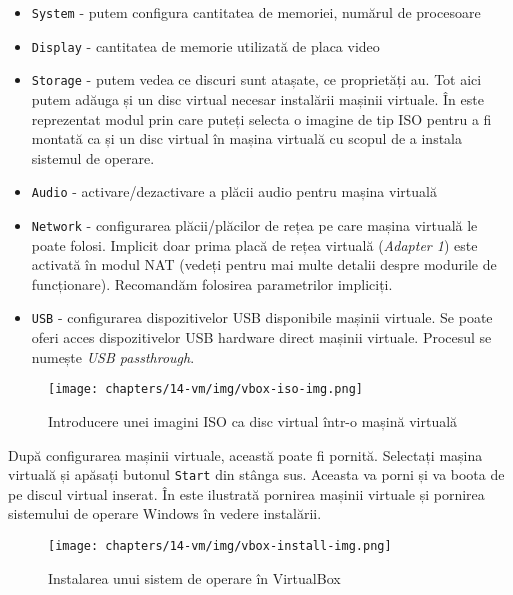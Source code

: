 \begin{itemize}
  \item \texttt{System} - putem configura cantitatea de memoriei, numărul de
		procesoare
              \item \texttt{Display} - cantitatea de memorie utilizată de placa video
              \item \texttt{Storage} - putem vedea ce discuri sunt atașate, ce proprietăți au.
		Tot aici putem adăuga și un disc virtual necesar instalării
		mașinii virtuale. În 
		este reprezentat modul prin care puteți selecta o imagine de tip
		ISO pentru a fi montată ca și un disc virtual în mașina virtuală
		cu scopul de a instala sistemul de operare.
              \item \texttt{Audio} - activare/dezactivare a plăcii audio pentru mașina virtuală
              \item \texttt{Network} - configurarea plăcii/plăcilor de rețea pe care mașina
		virtuală le poate folosi. Implicit doar prima placă de rețea virtuală
		(\textit{Adapter 1}) este activată în modul NAT (vedeți
		 pentru mai multe
		detalii despre modurile de funcționare). Recomandăm folosirea
		parametrilor impliciți.
              \item \texttt{USB} - configurarea dispozitivelor USB disponibile mașinii
		virtuale. Se poate oferi acces dispozitivelor USB hardware direct
		mașinii virtuale. Procesul se numește \textit{USB passthrough}.
\end{itemize}

\begin{figure}[!htbp]
	\centering
	\texttt{[image: chapters/14-vm/img/vbox-iso-img.png]}
	\caption{Introducere unei imagini ISO ca disc virtual într-o mașină virtuală}
	\label{fig:vm:vbox-iso}
\end{figure}

După configurarea mașinii virtuale, această poate fi pornită. Selectați mașina
virtuală și apăsați butonul \texttt{Start} din stânga sus. Aceasta va porni și va boota
de pe discul virtual inserat. În
 este ilustrată pornirea mașinii
virtuale și pornirea sistemului de operare Windows în vedere instalării.

\begin{figure}[!htbp]
	\centering
	\texttt{[image: chapters/14-vm/img/vbox-install-img.png]}
	\caption{Instalarea unui sistem de operare în VirtualBox}
	\label{fig:vm:vbox-install}
\end{figure}

